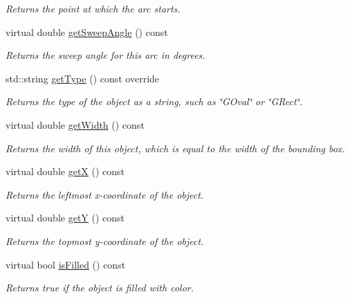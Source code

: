 \begin{DoxyCompactItemize}
\begin{DoxyCompactList}\small\item\em Returns the point at which the arc starts. \end{DoxyCompactList}\item 
virtual double \mbox{\hyperlink{classsgl_1_1GArc_ae842751a5db1493113ff347e564efae1}{get\+Sweep\+Angle}} () const
\begin{DoxyCompactList}\small\item\em Returns the sweep angle for this arc in degrees. \end{DoxyCompactList}\item 
std\+::string \mbox{\hyperlink{classsgl_1_1GArc_a9b72ede4ee8520f987a0c01e30654814}{get\+Type}} () const override
\begin{DoxyCompactList}\small\item\em Returns the type of the object as a string, such as {\ttfamily \char`\"{}\+G\+Oval\char`\"{}} or {\ttfamily \char`\"{}\+G\+Rect\char`\"{}}. \end{DoxyCompactList}\item 
virtual double \mbox{\hyperlink{classsgl_1_1GObject_a0ed2965abd4f5701d2cadf71239faf19}{get\+Width}} () const
\begin{DoxyCompactList}\small\item\em Returns the width of this object, which is equal to the width of the bounding box. \end{DoxyCompactList}\item 
virtual double \mbox{\hyperlink{classsgl_1_1GObject_a344385751bee0720059403940d57a13e}{getX}} () const
\begin{DoxyCompactList}\small\item\em Returns the leftmost {\itshape x}-\/coordinate of the object. \end{DoxyCompactList}\item 
virtual double \mbox{\hyperlink{classsgl_1_1GObject_aafa51c7f8f38a09febbb9ce7853f77b4}{getY}} () const
\begin{DoxyCompactList}\small\item\em Returns the topmost {\itshape y}-\/coordinate of the object. \end{DoxyCompactList}\item 
virtual bool \mbox{\hyperlink{classsgl_1_1GObject_a11c404f106940c201b6f326e0355c150}{is\+Filled}} () const
\begin{DoxyCompactList}\small\item\em Returns {\ttfamily true} if the object is filled with color. \end{DoxyCompactList}\item 

\end{DoxyCompactItemize}
